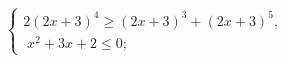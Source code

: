 \begin{ex}[type=ineq_system]
	\begin{condition}
		$\begin{cases} 2(2x + 3)^4\geqslant(2x + 3)^3 + (2x + 3)^5 ,\\
			\;x^2 + 3x + 2\leqslant0  ;
		\end{cases}$
	\end{condition}
\end{ex}